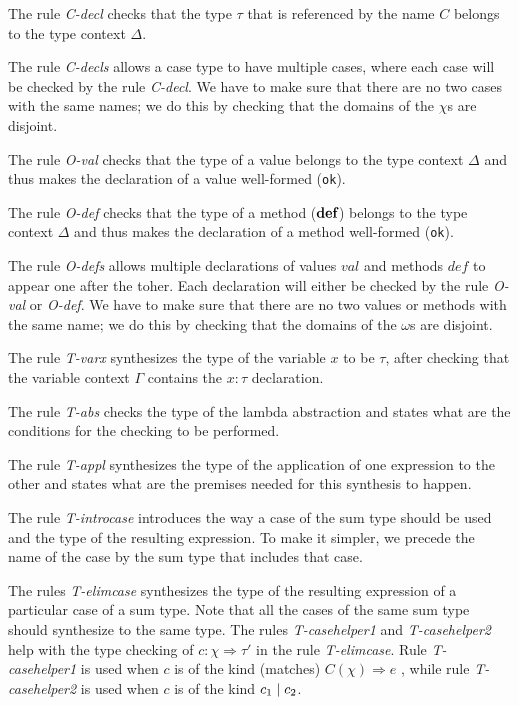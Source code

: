 The rule \textit{C-decl} checks that the type $\tau$ that is referenced by the name $C$ belongs to the type context $\Delta$.

The rule \textit{C-decls} allows a case type to have multiple cases, where each case will be checked by the rule \textit{C-decl}. We have to make sure that there are no two cases with the same names; we do this by checking that the domains of the $\chi$s are disjoint.

The rule \textit{O-val} checks that the type of a value belongs to the type context $\Delta$ and thus makes the declaration of a value well-formed (\texttt{ok}).

The rule \textit{O-def} checks that the type of a method ($\textbf{def}$) belongs to the type context $\Delta$ and thus makes the declaration of a method well-formed (\texttt{ok}).

The rule \textit{O-defs} allows multiple declarations of values $val$ and methods $def$ to appear one after the toher. Each declaration will either be checked by the rule \textit{O-val} or \textit{O-def}. We have to make sure that there are no two values or methods with the same name; we do this by checking that the domains of the $\omega$s are disjoint.

The rule \textit{T-varx} synthesizes the type of the variable $x$ to be $\tau$, after checking that the variable context $\Gamma$ contains the $x:\tau$ declaration. 

The rule \textit{T-abs} checks the type of the lambda abstraction and states what are the conditions for the checking to be performed.

The rule \textit{T-appl} synthesizes the type of the application of one expression to the other and states what are the premises needed for this synthesis to happen.

The rule \textit{T-introcase} introduces the way a case of the sum type should be used and the type of the resulting expression. To make it simpler, we precede the name of the case by the sum type that includes that case.

The rules \textit{T-elimcase} synthesizes the type of the resulting expression of a particular case of a sum type. Note that all the cases of the same sum type should synthesize to the same type. The rules  \textit{T-casehelper1} and \textit{T-casehelper2} help with the type checking of $c:\chi \Rightarrow \tau'$ in the rule \textit{T-elimcase}. Rule \textit{T-casehelper1} is used when $c$ is of the kind (matches) $C(\chi)\Rightarrow e$ , while rule \textit{T-casehelper2} is used when $c$ is of the kind $c_1 \mathrel{\mid} c_2$.


